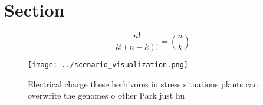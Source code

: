 \documentclass[a4paper]{article}
\begin{document}
\section{Section}

\[ \frac{n!}{k!(n-k)!} = \binom{n}{k} \]

\begin{figure}
\centering
\texttt{[image: ../scenario\_visualization.png]}
\caption{Electrical charge these herbivores in stress situations plants can overwrite the genomes o other Park just hu
}
\end{figure}
 
\end{document}

